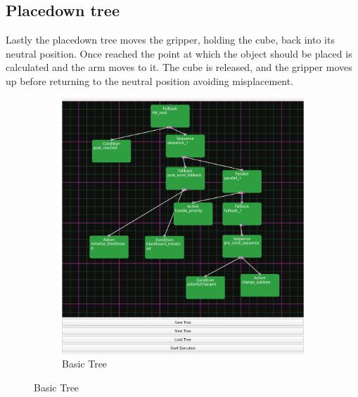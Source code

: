 \documentclass[report]{iisthesis}
\begin{document}
\subsection{Placedown tree}
Lastly the placedown tree moves the gripper, holding the cube, back into its neutral position. Once reached the point at which the object should be placed is calculated and the arm moves to it.
The cube is released, and the gripper moves up before returning to the neutral position avoiding misplacement.

\begin{figure}[htp]
    \centering
    \begin{subfigure}[b]{.45\linewidth}
    \includegraphics[width=\linewidth]{basicTree.png}
    \caption{Basic Tree}
    \end{subfigure}


\end{figure}
\end{document}
